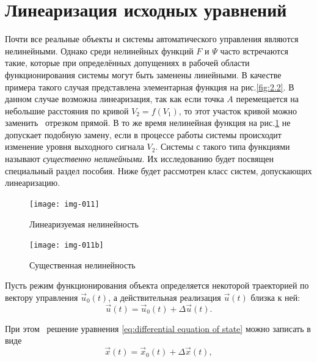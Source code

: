 \section{Линеаризация исходных уравнений}
		Почти все реальные объекты и системы автоматического управления являются нелинейными. Однако среди нелинейных функций 
		$F$ и  $\Psi$ часто встречаются такие, которые при определённых допущениях в рабочей области функционирования системы
		могут быть заменены линейными. В качестве примера такого случая представлена элементарная функция на рис.\ref{fig:2.2}. %
		 В данном
		случае возможна линеаризация, так как если точка  $A$ перемещается на небольшие расстояния по кривой  $V_2=f(V_1)$, то
		этот участок кривой можно заменить \ отрезком прямой. В то же время нелинейная функция на рис.\ref{fig:2.3} %
		не допускает подобную
		замену, если в процессе работы системы происходит изменение уровня выходного сигнала  $V_2$. Системы с такого типа
		функциями называют \textit{существенно нелинейными}. Их исследованию будет посвящен специальный раздел пособия. Ниже
		будет рассмотрен класс систем, допускающих линеаризацию.




\begin{figure}[h]
	\begin{center}
		\begin{minipage}[h]{0.4\linewidth}
			\texttt{[image: img-011]}
			\caption{Линеаризуемая нелинейность } %
			\label{fig:2.2} %
		\end{minipage}
		\hfill 
		\begin{minipage}[h]{0.4\linewidth}
			\texttt{[image: img-011b]}
			\caption{Существенная  нелинейность}
			\label{fig:2.3}
		\end{minipage}
	\end{center}
\end{figure}


\bigskip


		Пусть режим функционирования объекта определяется некоторой траекторией по вектору управления  $\vec u_0(t)$, а
		действительная реализация  $\vec u(t)$ близка к ней:
	\begin{equation}\label{key}
		 \vec u(t)=\vec u_0(t)+\Delta \vec u(t). %
	\end{equation}

		При этом \ решение уравнения \eqref{eq:differential equation of state} %
		можно записать в виде
\begin{equation}\label{key}
		\vec x(t)=\vec x_0(t)+\Delta \vec x(t), %
\end{equation}



